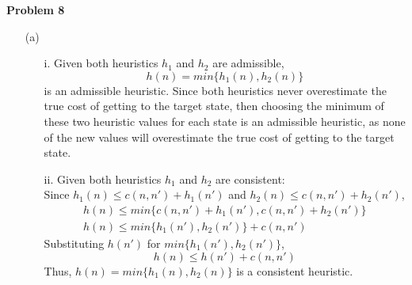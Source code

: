 \documentclass[11pt]{article}
\begin{document}
    \begin{center}
        \Large
        \textbf{Problem 8}
    \end{center}
    \normalsize
    \begin{enumerate}
        \item[(a)]
            \begin{enumerate}
                \item[i.] Given both heuristics $h_1$ and $h_2$ are admissible,
                \[h(n) = min\{h_1(n), h_2(n)\}\] is an admissible heuristic.
                Since both heuristics never overestimate the true cost of getting to the target state, then choosing the minimum
                of these two heuristic values for each state is an admissible heuristic, as none of the
                new values will overestimate the true cost of getting to the target state.
                \item[ii.] Given both heuristics $h_1$ and $h_2$ are consistent: \\
                Since $h_1(n) \leq c(n, n') + h_1(n')$ and $h_2(n) \leq c(n, n') + h_2(n')$,
                \begin{gather*}
                    h(n) \leq min\{c(n, n') + h_1(n'), c(n, n') + h_2(n')\}\\
                    h(n) \leq min\{h_1(n'), h_2(n')\} + c(n, n')
                \end{gather*}
                Substituting $h(n')$ for $min\{h_1(n'), h_2(n')\}$,
                \[h(n) \leq h(n') + c(n, n')\]
                Thus, $h(n) = min\{h_1(n), h_2(n)\}$ is a consistent heuristic.
            \end{enumerate}


\end{enumerate}
\end{document}
